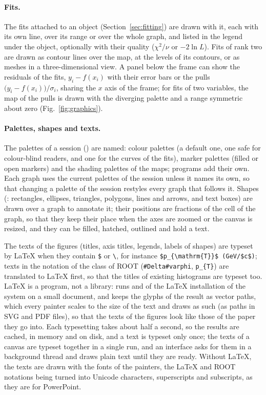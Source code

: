 \paragraph{Fits.}
The fits attached to an object (Section~\ref{sec:fitting}) are drawn with it, each with its own line, over its range
or over the whole graph, and listed in the legend under the object, optionally with their quality
($\chi^2/\nu$ or $-2\ln L$). Fits of rank two are drawn as contour lines over the map, at the levels of its
contours, or as meshes in a three-dimensional view. A panel below the frame can show the residuals of the fits,
$y_i - f(x_i)$ with their error bars or the pulls $\bigl(y_i - f(x_i)\bigr)/\sigma_i$, sharing the $x$ axis of the
frame; for fits of two variables, the map of the pulls is drawn with the diverging palette and a range symmetric
about zero (Fig.~\ref{fig:graphics}).

\paragraph{Palettes, shapes and texts.}
The palettes of a session () are named: colour palettes (a default one, one safe for colour-blind
readers, and one for the curves of the fits), marker palettes (filled or open markers) and the shading palettes of the
maps; programs add their own. Each graph uses the current palettes of the session unless it names its own, so that
changing a palette of the session restyles every graph that follows it. Shapes (: rectangles, ellipses,
triangles, polygons, lines and arrows, and text boxes) are drawn over a graph to annotate it; their positions are
fractions of the cell of the graph, so that they keep their place when the axes are zoomed or the canvas is resized,
and they can be filled, hatched, outlined and hold a text.

The texts of the figures (titles, axis titles, legends, labels of shapes) are typeset by \LaTeX{} when they contain
\verb|$| or \verb|\|, for instance \verb|$p_{\mathrm{T}}$ (GeV/$c$)|; texts in the notation of the 
class of ROOT (\verb|#Delta#varphi|, \verb|p_{T}|) are translated to \LaTeX{} first, so that the titles of existing
histograms are typeset too. \LaTeX{} is a program, not a library:  runs  and
 of the \LaTeX{} installation of the system on a small document, and keeps the glyphs of the result as
vector paths, which every painter scales to the size of the text and draws as such (as paths in SVG and PDF files),
so that the texts of the figures look like those of the paper they go into. Each typesetting takes about half a
second, so the results are cached, in memory and on disk, and a text is typeset only once; the texts of a canvas
are typeset together in a single run, and an interface asks for them in a background thread and draws plain text
until they are ready. Without \LaTeX{}, the texts are drawn with the fonts of the painters, the \LaTeX{} and ROOT
notations being turned into Unicode characters, superscripts and subscripts, as they are for PowerPoint.

